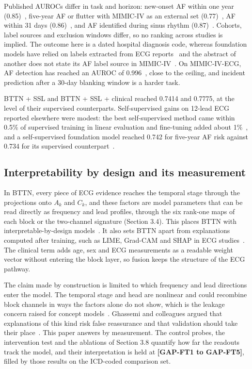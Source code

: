 \documentclass[preprint,12pt]{elsarticle}
\begin{document}
Published AUROCs differ in task and horizon: new-onset AF within one year (0.85)~\cite{raghunath2021}, five-year AF or flutter with MIMIC-IV as an external set (0.77)~\cite{jabbour2024}, AF within 31 days (0.86)~\cite{yuan2023}, and AF identified during sinus rhythm (0.87)~\cite{attia2019}. Cohorts, label sources and exclusion windows differ, so no ranking across studies is implied. The outcome here is a dated hospital diagnosis code, whereas foundation models have relied on labels extracted from ECG reports~\cite{nolinlapalme2026} and the abstract of another does not state its AF label source in MIMIC-IV~\cite{ko2026}. On MIMIC-IV-ECG, AF detection has reached an AUROC of 0.996~\cite{mckeen2025}, close to the ceiling, and incident prediction after a 30-day blanking window is a harder task.

BTTN + SSL and BTTN + SSL + clinical reached 0.7414 and 0.7775, at the level of their supervised counterparts. Self-supervised gains on 12-lead ECG reported elsewhere were modest: the best self-supervised method came within 0.5\% of supervised training in linear evaluation and fine-tuning added about 1\%~\cite{mehari2022}, and a self-supervised foundation model reached 0.742 for five-year AF risk against 0.734 for its supervised counterpart~\cite{nolinlapalme2026}.

\subsection{Interpretability by design and its measurement}

In BTTN, every piece of ECG evidence reaches the temporal stage through the projections onto $A_k$ and $C_k$, and these factors are model parameters that can be read directly as frequency and lead profiles, through the six rank-one maps of each block or the two-channel signature (Section 3.4). This places BTTN with interpretable-by-design models~\cite{rudin2019,koh2020,bohle2022}. It also sets BTTN apart from explanations computed after training, such as LIME, Grad-CAM and SHAP in ECG studies~\cite{hughes2021,storas2023,matsuo2026}. The clinical term adds age, sex and ECG measurements as a readable weight vector without entering the block layer, so fusion keeps the structure of the ECG pathway.

The claim made by construction is limited to which frequency and lead directions enter the model. The temporal stage and head are nonlinear and could recombine block channels in ways the factors alone do not show, which is the leakage concern raised for concept models~\cite{mahinpei2021,havasi2022}. Ghassemi and colleagues argued that explanations of this kind risk false reassurance and that validation should take their place~\cite{ghassemi2021}. This paper answers by measurement. The control probes, the intervention test and the ablations of Section 3.8 quantify how far the readouts track the model, and their interpretation is held at \textbf{[GAP-FT1 to GAP-FT5]}, filled by those results on the ICD-coded comparison set.
\end{document}
